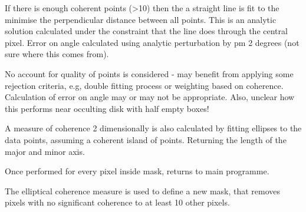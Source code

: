 \documentclass{article}
\begin{document}
If there is enough coherent points (>10) then the 
a straight line is fit to the minimise the perpendicular distance between all points. This is an analytic solution calculated under the constraint that the line does through the central pixel. Error on angle
calculated using analytic perturbation by pm 2 degrees (not sure where this comes from).

No account for quality of points is considered - may benefit from applying some rejection criteria, e.g, double fitting process or weighting based on coherence. Calculation of error on angle may or may not be appropriate. Also, unclear how this performs near occulting disk with half empty boxes!

A measure of coherence 2 dimensionally is also calculated by fitting ellipses to the data points, assuming a coherent island of points. Returning the length of the major and minor axis.

Once performed for every pixel inside mask, returns to main programme.

The elliptical coherence measure is used to define a new mask, that removes pixels with no significant coherence to at least 10 other pixels.
\end{document}
